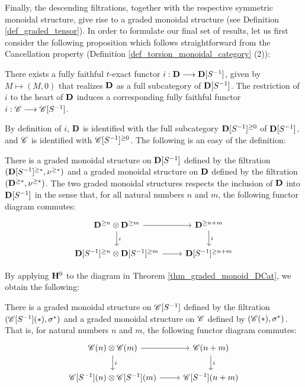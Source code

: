 Finally, the descending filtrations, together with
the respective symmetric monoidal structure, give rise to a
graded monoidal structure (see Definition 
\ref{def_graded_tensor}). In order to formulate our final set of 
results, let us first consider the following proposition which 
follows straightforward from the Cancellation property (Definition
\ref{def_torsion_monoidal_category} (2)):

\begin{prop}
There exists a fully faithful $t$-exact functor $i: \DCat \to 
\DCatLoc{S}$, given by $M \mapsto (M, 0)$ that realizes $\DCat$ 
as a full subcategory of $\DCatLoc{S}$. The restriction of $i$ 
to the heart of $\DCat$ induces a corresponding fully faithful 
functor $i : \Cat{C} \to \CatLoc{C}{S}$.
\end{prop}

By definition of $i$, $\DCat$ is identified with the full 
subcategory $\Prerad{0}{\DCatLoc{S}}$ of $\DCatLoc{S}$, and
$\Cat{C}$ is identified with $\Prerad{0}{\CatLoc{C}{S}}$.
The following is an easy of the definition:

\begin{thm}\label{thm_graded_monoid_DCat}
There is a graded monoidal structure on $\DCatLoc{S}$ defined by
the filtration $(\Prerad{*}{\DCatLoc{S}}, \preradD{*})$ and a 
graded monoidal structure on $\DCat$ defined by the filtration
$(\Prerad{*}{\DCat}, \preradD{*})$. The two graded monoidal 
structures respects the inclusion of $\DCat$ into $\DCatLoc{S}$ in 
the sense that, for all natural numbers $n$ and $m$, the following 
functor diagram commutes:
\[
\begin{tikzcd}
\Prerad{n}{\DCat} \tensor \Prerad{m}{\DCat} \arrow{r} \arrow{d}{i} &
\Prerad{n + m}{\DCat} \arrow{d}{i} \\
\Prerad{n}{\DCatLoc{S}} \tensor \Prerad{m}{\DCatLoc{S}} \arrow{r} &
\Prerad{n + m}{\DCatLoc{S}}
\end{tikzcd}
\]
\end{thm}

By applying $\HH^0$ to the diagram in Theorem 
\ref{thm_graded_monoid_DCat}, we obtain the following:

\begin{cor}
There is a graded monoidal structure on $\CatLoc{C}{S}$ defined
by the filtration $(\SGFilt{*}{\CatLoc{C}{S}}, \sgHI{*})$ and a graded 
monoidal structure on $\Cat{C}$ defined by $(\SGFilt{*}{\Cat{C}}, 
\sgHI{*})$. That is, for natural numbers $n$ and $m$, the 
following functor diagram commutes:
\[
\begin{tikzcd}
\SGFilt{n}{\Cat{C}} \tensor \SGFilt{m}{\Cat{C}} \arrow{r} \arrow{d}{i} &
\SGFilt{n + m}{\Cat{C}} \arrow{d}{i} \\
\SGFilt{n}{\CatLoc{C}{S}} \tensor \SGFilt{m}{\CatLoc{C}{S}} \arrow{r} &
\SGFilt{n + m}{\CatLoc{C}{S}}
\end{tikzcd}
\]
\end{cor}

